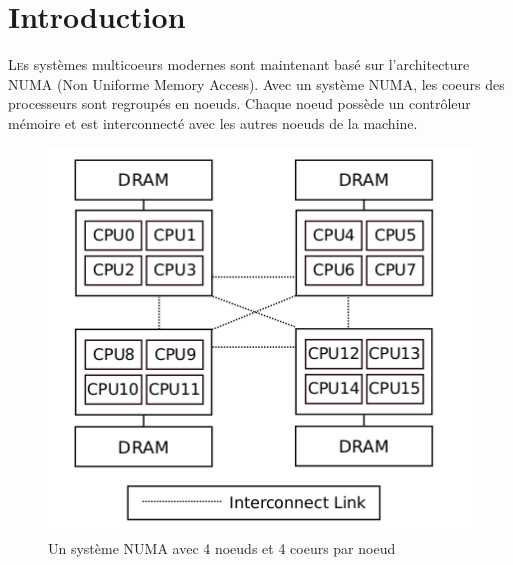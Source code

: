 
\section{Introduction}

  \lettrine[nindent=0em,lines=3]{L} es systèmes multicoeurs modernes sont
  maintenant basé sur l'architecture NUMA (Non Uniforme Memory Access). Avec un
  système NUMA, les coeurs des processeurs sont regroupés en noeuds. Chaque
  noeud possède un contrôleur mémoire et est interconnecté avec les autres
  noeuds de la machine.

  \begin{figure}[H]
    \includegraphics[scale=0.4]{img/numa_arch.png}
    \caption{\label{f:my_fig}Un système NUMA avec 4 noeuds et 4 coeurs par noeud}
  \end{figure}

